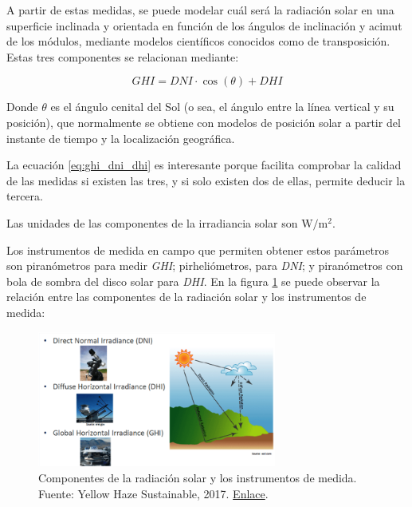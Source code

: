 A partir de estas medidas, se puede modelar cuál será la radiación solar en una superficie inclinada y orientada en función de los ángulos de inclinación y \gls{acimut} de los módulos, mediante modelos científicos conocidos como de \gls{transposición}. Estas tres componentes se relacionan mediante:

\begin{equation} \label{eq:ghi_dni_dhi}
      GHI = DNI \cdot \cos(\theta) + DHI
\end{equation}

Donde $\theta$ es el ángulo cenital del Sol (o sea, el ángulo entre la línea vertical y su posición), que normalmente se obtiene con modelos de posición solar a partir del instante de tiempo y la localización geográfica.

La ecuación \ref{eq:ghi_dni_dhi} es interesante porque facilita comprobar la calidad de las medidas si existen las tres, y si solo existen dos de ellas, permite deducir la tercera.

Las unidades de las componentes de la irradiancia solar son $\si{\watt\per\meter\squared}$.

Los instrumentos de medida en campo que permiten obtener estos parámetros son \glspl{piranómetro} para medir \textit{\gls{GHI}}; \glspl{pirheliómetro}, para \textit{\gls{DNI}}; y \glspl{piranómetro} con bola de sombra del disco solar para \textit{\gls{DHI}}. En la figura \ref{fig:irrad_componentes} se puede observar la relación entre las componentes de la radiación solar y los instrumentos de medida:

\begin{figure}[H]
      \centering
      \includegraphics[width=0.7\textwidth]{./images/SoA_irrad/dni-dhi-ghi-1-768x437.png}
      \caption{Componentes de la radiación solar y los instrumentos de medida. Fuente: Yellow Haze Sustainable, 2017. \href{http://web.archive.org/web/20230624215046/https://yellowhaze.in/wp-content/uploads/2017/01/dni-dhi-ghi-1-768x437.png}{Enlace}.}
      \label{fig:irrad_componentes}
\end{figure}

